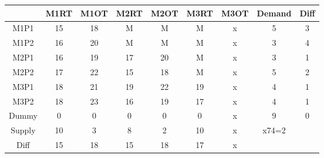 \documentclass{article}%
\begin{document}
\begin{tabular}{c|ccc|c|cccc}
    & M1RT & M1OT & M2RT & M2OT & M3RT & M3OT & Demand               & Diff                 \\
    \midrule
    M1P1   & 15   & 18   & M    & M    & M    & x    & 5                    & 3                    \\
    M1P2   & 16   & 20   & M    & M    & M    & x    & 3                    & 4                    \\
    M2P1   & 16   & 19   & 17   & 20   & M    & x    & 3                    & 1                    \\
    M2P2   & 17   & 22   & 15   & 18   & M    & x    & 5                    & 2                    \\
    M3P1   & 18   & 21   & 19   & 22   & 19   & x    & 4                    & 1                    \\
    M3P2   & 18   & 23   & 16   & 19   & 17   & x    & 4                    & 1                    \\
    \cmidrule{2-9}
    Dummy  & 0    & 0    & 0    & 0    & 0    & x    & 9                    & 0                    \\
    \cmidrule{2-9}
    Supply & 10   & 3    & 8    & 2    & 10   & x    & x74=2                &                      \\
    Diff   & 15   & 18   & 15   & 18   & 17   & x    &                      &                      \\
\end{tabular}
\newline
\newline
\end{document}
